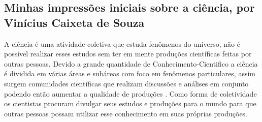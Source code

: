 \subsection{Minhas impressões iniciais sobre a ciência, por Vinícius Caixeta de Souza}

A ciência é uma atividade coletiva que estuda fenômenos do universo, não é possível realizar esses estudos sem ter em mente produções científicas feitas por outras pessoas. Devido a grande quantidade de \gls{Conhecimento-Cientifico} a ciência é dividida em várias áreas e subáreas com foco em fenômenos particulares, assim surgem comunidades científicas que realizam discussões e análises em conjunto podendo então aumentar a qualidade de produções \citep{noauthor_comunidade_nodate}. Como forma de coletividade os cientistas procuram divulgar seus estudos e produções para o mundo para que outras pessoas possam utilizar esse conhecimento em suas próprias produções.